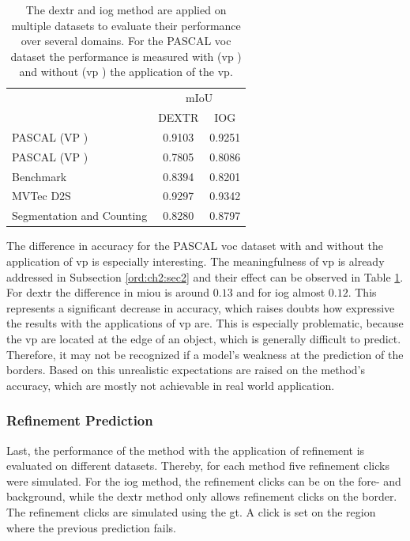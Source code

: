 \begin{table}[h!]
	\centering
	\begin{tabular}{l|c c}
		\toprule 		
										& \multicolumn{2}{c}{mIoU}\\
										&  DEXTR 	& IOG		\\
		\midrule
		PASCAL (VP \cmark)				& 0.9103 	& 0.9251	\\
		PASCAL (VP \xmark)				& 0.7805	& 0.8086	\\
		Benchmark 						& 0.8394 	& 0.8201	\\
		MVTec D2S						& 0.9297	& 0.9342	\\
		Segmentation and Counting		& 0.8280	& 0.8797 	\\							
		\bottomrule
	\end{tabular}
	\caption[Generalization of IOG and DEXTR]{
		The \gls{dextr} and \gls{iog} method are applied on multiple datasets to evaluate their performance over several domains.
		For the PASCAL \gls{voc} dataset the performance is measured with (\gls{vp} \cmark) and without (\gls{vp} \xmark) the application of the \gls{vp}.
	}\label{tab:ch5:tests_on_datasets}
\end{table}

The difference in accuracy for the PASCAL \gls{voc} dataset \cite{Eve20-PascalVOC} with and without the application of \gls{vp} is especially interesting.
The meaningfulness of \gls{vp} is already addressed in Subsection \ref{ord:ch2:sec2} and their effect can be observed in Table \ref{tab:ch5:tests_on_datasets}.
For \Gls{dextr} the difference in \gls{miou} is around $ 0.13 $ and for \gls{iog} almost $ 0.12 $.
This represents a significant decrease in accuracy, which raises doubts how expressive the results with the applications of \gls{vp} are.
This is especially problematic, because the \gls{vp} are located at the edge of an object, which is generally difficult to predict.
Therefore, it may not be recognized if a model's weakness at the prediction of the borders.
Based on this unrealistic expectations are raised on the method's accuracy, which are mostly not achievable in real world application.

\subsubsection{Refinement Prediction}

Last, the performance of the method with the application of refinement is evaluated on different datasets.
Thereby, for each method five refinement clicks were simulated.
For the \gls{iog} method, the refinement clicks can be on the fore- and background, while the \gls{dextr} method only allows refinement clicks on the border.
The refinement clicks are simulated using the \gls{gt}.
A click is set on the region where the previous prediction fails.


